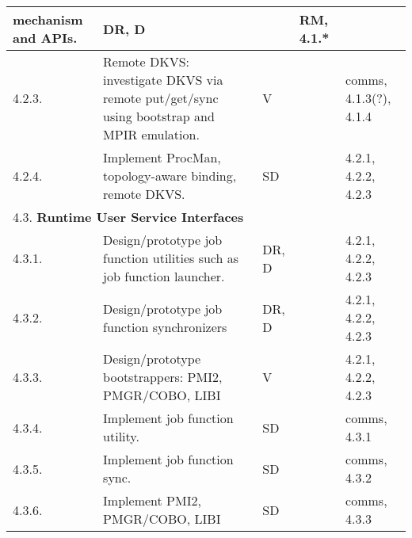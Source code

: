 \begin{longtable}{|p{1cm}|p{10.2cm}|p{1cm}|p{1cm}|p{1.8cm}|}
          mechanism and APIs.
        & DR, D
        & 
        & RM, 4.1.*\\
  \hline
  4.2.3.& Remote DKVS: investigate DKVS via remote put/get/sync using
	  bootstrap and MPIR emulation.
        & V
        & 
        & comms, 4.1.3(?), 4.1.4\\
  \hline
  4.2.4.& Implement ProcMan, topology-aware binding, remote DKVS.
        & SD 
        & 
        & 4.2.1, 4.2.2, 4.2.3 \\
  \hline
  \multicolumn{5}{|l|}{4.3. \textbf{Runtime User Service Interfaces}} \\
  \hline
  4.3.1.& Design/prototype job function utilities such as job function
          launcher.
        & DR, D
        & 
        & 4.2.1, 4.2.2, 4.2.3 \\
  \hline
  4.3.2.& Design/prototype job function synchronizers
        & DR, D
        & 
        & 4.2.1, 4.2.2, 4.2.3 \\
  \hline
  4.3.3.& Design/prototype bootstrappers: PMI2, PMGR/COBO, LIBI
        & V
        & 
        & 4.2.1, 4.2.2, 4.2.3 \\
  \hline
  4.3.4.& Implement job function utility.
        & SD
        & 
        & comms, 4.3.1 \\
  \hline
  4.3.5.& Implement job function sync.
        & SD
        & 
        & comms, 4.3.2 \\
  \hline
  4.3.6.& Implement PMI2, PMGR/COBO, LIBI
        & SD
        & 
        & comms, 4.3.3 \\
  \hline
\end{longtable}
